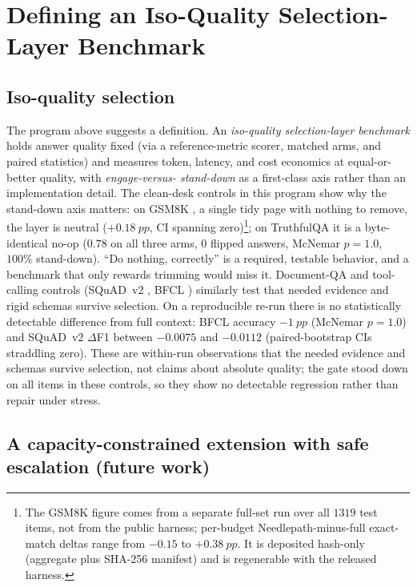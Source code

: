 \documentclass[11pt]{article}
\newcommand{\pp}{~pp}          %
\newcommand{\NP}{Needlepath}
\newcommand{\fn}[1]{{\ttfamily\seqsplit{#1}}}   %
\begin{document}
\section{Defining an Iso-Quality Selection-Layer Benchmark}
\label{sec:defn}

\subsection{Iso-quality selection}

The program above suggests a definition. An \emph{iso-quality selection-layer benchmark} holds
answer quality fixed (via a reference-metric scorer, matched arms, and paired statistics) and
measures token, latency, and cost economics at equal-or-better quality, with \emph{engage-versus-
stand-down} as a first-class axis rather than an implementation detail. The clean-desk controls in
this program show why the stand-down axis matters: on GSM8K \citep{cobbe2021gsm8k}, a single tidy
page with nothing to remove, the layer is neutral ($+0.18\pp$, CI spanning zero)\footnote{The GSM8K
figure comes from a separate full-set run over all $1319$ test items, not from the public
\fn{controls\_v1} harness; per-budget \NP{}-minus-full exact-match deltas range from $-0.15$ to
$+0.38\pp$. It is deposited hash-only (aggregate plus SHA-256 manifest) and is regenerable with the
released harness.}; on TruthfulQA
\citep{lin2022truthfulqa} it is a byte-identical no-op ($0.78$ on all three arms, $0$ flipped
answers, McNemar $p{=}1.0$, $100\%$ stand-down). ``Do nothing, correctly'' is a required, testable
behavior, and a benchmark that only rewards trimming would miss it. Document-QA and tool-calling
controls (SQuAD~v2 \citep{rajpurkar2018squad2}, BFCL \citep{bfcl2024}) similarly test that needed
evidence and rigid schemas survive selection. On a reproducible re-run there is no statistically
detectable difference from full context: BFCL accuracy $-1\pp$ (McNemar $p{=}1.0$) and SQuAD~v2
$\Delta$F1 between $-0.0075$ and $-0.0112$ (paired-bootstrap CIs straddling zero). These are
within-run observations that the needed evidence and schemas survive selection, not claims about
absolute quality; the gate stood down on all items in these controls, so they show no detectable
regression rather than repair under stress.

\subsection{A capacity-constrained extension with safe escalation (future work)}
\end{document}
